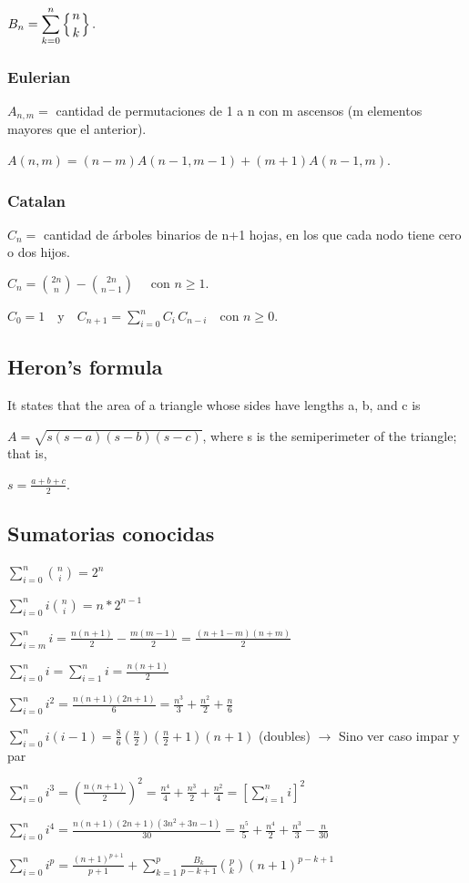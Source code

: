 {{\( {\displaystyle B_{n}=\sum _{k=0}^{n}\left\{{n \atop k}\right\}.} \) 


} 
\subsubsection{Eulerian}
{
\( {\displaystyle A_{n, m}=} \) cantidad de permutaciones de 1 a n con m ascensos (m elementos mayores que el anterior).

\( {\displaystyle A(n,m)=(n-m)A(n-1,m-1)+(m+1)A(n-1,m).} \)
}
\subsubsection{Catalan}
{
\( {\displaystyle C_{n}=} \) cantidad de árboles binarios de n+1 hojas, en los que cada nodo tiene cero o dos hijos.

\({\displaystyle C_{n}={2n \choose n}-{2n \choose n-1}\quad {\mbox{ con }}n\geq 1.} \)

\( {\displaystyle C_{0}=1\quad {\mbox{y}}\quad C_{n+1}=\sum _{i=0}^{n}C_{i}\,C_{n-i}\quad {\mbox{con }}n\geq 0.} \)
}

}

\subsection{Heron's formula}
{
It states that the area of a triangle whose sides have lengths a, b, and c is

\( {\displaystyle A={\sqrt {s(s-a)(s-b)(s-c)}}} \),
where s is the semiperimeter of the triangle; that is,

\( {\displaystyle s={\frac {a+b+c}{2}}} \).
}

\subsection{Sumatorias conocidas}
{
$\sum_{i=0}^n\binom{n}{i}=2^n$

$\sum_{i=0}^n i\binom{n}{i}=n*2^{n-1}$

$\sum_{i=m}^n i = \frac{n(n+1)}{2} - \frac{m(m-1)}{2} = \frac{(n+1-m)(n+m)}{2}$

$\sum_{i=0}^n i = \sum_{i=1}^n i = \frac{n(n+1)}{2}$

$\sum_{i=0}^n i^2 = \frac{n(n+1)(2n+1)}{6} = \frac{n^3}{3} + \frac{n^2}{2} + \frac{n}{6}$

$\sum_{i=0}^n i(i-1) = \frac{8}{6}(\frac{n}{2})(\frac{n}{2}+1)(n+1)$ (doubles) $\rightarrow$ Sino ver caso impar y par

$\sum_{i=0}^n i^3 = \left(\frac{n(n+1)}{2}\right)^2 = \frac{n^4}{4} + \frac{n^3}{2} + \frac{n^2}{4} = \left[\sum_{i=1}^n i\right]^2$

$\sum_{i=0}^n i^4 = \frac{n(n+1)(2n+1)(3n^2+3n-1)}{30} = \frac{n^5}{5} + \frac{n^4}{2} + \frac{n^3}{3} - \frac{n}{30}$

$\sum_{i=0}^n i^p = \frac{(n+1)^{p+1}}{p+1} + \sum_{k=1}^p\frac{B_k}{p-k+1}{p\choose k}(n+1)^{p-k+1}$

}


